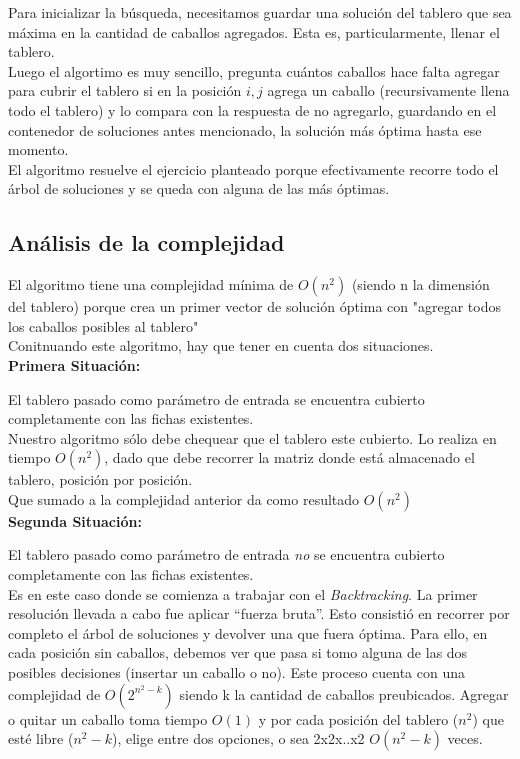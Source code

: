 Para inicializar la b\'usqueda, necesitamos guardar una soluci\'on del tablero que sea m\'axima en la cantidad de caballos agregados. Esta es, particularmente, llenar el tablero.\\

Luego el algortimo es muy sencillo, pregunta cu\'antos caballos hace falta agregar para cubrir el tablero si en la posici\'on $i, j$ agrega un caballo (recursivamente llena todo el tablero) y lo compara con la respuesta de no agregarlo, guardando en el contenedor de soluciones antes mencionado, la soluci\'on m\'as \'optima hasta ese momento.\\

El algoritmo resuelve el ejercicio planteado porque efectivamente recorre todo el \'arbol de soluciones y se queda con alguna de las m\'as \'optimas.\\

\newpage

\subsection{An\'alisis de la complejidad}
El algoritmo tiene una complejidad m\'inima de $O(n^{2})$ (siendo n la dimensi\'on del tablero) porque crea un primer vector de soluci\'on \'optima con "agregar todos los caballos posibles al tablero"\\

Conitnuando este algoritmo, hay que tener en cuenta dos situaciones.\\

\textbf{Primera Situaci\'on: }

El tablero pasado como par\'ametro de entrada se encuentra cubierto completamente con las fichas existentes.\\

Nuestro algoritmo s\'olo debe chequear que el tablero este cubierto. Lo realiza en tiempo $O(n^{2})$, dado que debe recorrer la matriz donde est\'a almacenado el tablero, posici\'on por posici\'on.\\

Que sumado a la complejidad anterior da como resultado $O(n^{2})$\\

\textbf{Segunda Situaci\'on: }

El tablero pasado como par\'ametro de entrada \emph{no} se encuentra cubierto completamente con las fichas existentes.\\

Es en este caso donde se comienza a trabajar con el \emph{Backtracking}. La primer resoluci\'on llevada a cabo fue aplicar ``fuerza bruta''. Esto consisti\'o en recorrer por completo el \'arbol de soluciones y devolver una que fuera \'optima. Para ello, en cada posici\'on sin caballos, debemos ver que pasa si tomo alguna de las dos posibles decisiones (insertar un caballo o no). Este proceso cuenta con una complejidad de $O(2^{n^{2} - k})$ siendo k la cantidad de caballos preubicados. Agregar o quitar un caballo toma tiempo $O(1)$ y por cada posici\'on del tablero ($n^{2}$) que est\'e libre ($n^{2} - k$), elige entre dos opciones, o sea 2x2x..x2 $O(n^{2}-k)$ veces.\\

